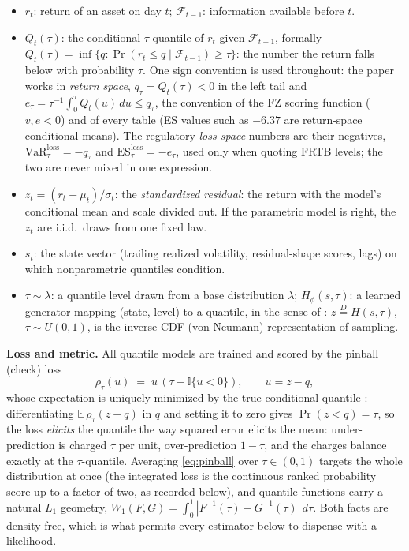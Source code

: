 \documentclass[11pt]{article}
\newcommand{\VaR}{\mathrm{VaR}}
\newcommand{\ES}{\mathrm{ES}}
\theoremstyle{remark}
\begin{document}
\begin{itemize}[leftmargin=1.5em,itemsep=0pt]
\item $r_t$: return of an asset on day $t$; $\mathcal{F}_{t-1}$: information available before $t$.
\item $Q_t(\tau)$: the conditional $\tau$-quantile of $r_t$ given
$\mathcal{F}_{t-1}$, formally
$Q_t(\tau) = \inf\{q : \Pr(r_t \le q \mid \mathcal{F}_{t-1}) \ge \tau\}$:
the number the return falls below with probability $\tau$. One sign
convention is used throughout: the paper works in \emph{return space},
$q_\tau = Q_t(\tau) < 0$ in the left tail and
$e_\tau = \tau^{-1}\int_0^{\tau} Q_t(u)\,du \le q_\tau$, the
convention of the FZ scoring function ($v,e<0$) and of every table
(ES values such as $-6.37$ are return-space conditional means). The
regulatory \emph{loss-space} numbers are their negatives,
$\VaR^{\mathrm{loss}}_\tau=-q_\tau$ and
$\ES^{\mathrm{loss}}_\tau=-e_\tau$, used only when quoting FRTB
levels; the two are never mixed in one expression.
\item $z_t = (r_t-\mu_t)/\sigma_t$: the \emph{standardized residual}:
the return with the model's conditional mean and scale divided out. If
the parametric model is right, the $z_t$ are i.i.d.\ draws from one
fixed law.
\item $s_t$: the state vector (trailing realized volatility,
residual-shape scores, lags) on which nonparametric quantiles condition.
\item $\tau \sim \lambda$: a quantile level drawn from a base
distribution $\lambda$; $H_\phi(s,\tau)$: a learned generator mapping
(state, level) to a quantile, in the sense of
\citet{polson2023gbc}: $z \overset{D}{=} H(s,\tau)$, $\tau\sim U(0,1)$,
is the inverse-CDF (von Neumann) representation of sampling.
\end{itemize}

\noindent\textbf{Loss and metric.} All quantile models are trained and
scored by the pinball (check) loss
\begin{equation}
\rho_\tau(u) \;=\; u\,(\tau - \mathbb{I}\{u<0\}),
\qquad u = z - q,
\label{eq:pinball}
\end{equation}
whose expectation is uniquely minimized by the true conditional quantile
\citep{koenker1978}: differentiating
$\mathbb{E}\,\rho_\tau(z - q)$ in $q$ and setting it to zero gives
$\Pr(z < q) = \tau$, so the loss \emph{elicits} the quantile the way
squared error elicits the mean: under-prediction is charged $\tau$
per unit, over-prediction $1-\tau$, and the charges balance exactly at
the $\tau$-quantile. Averaging \eqref{eq:pinball} over $\tau\in(0,1)$
targets the whole distribution at once (the integrated loss is the
continuous ranked probability score up to a factor of two, as recorded
below), and quantile functions carry a natural $L_1$ geometry,
$W_1(F,G)=\int_0^1 |F^{-1}(\tau)-G^{-1}(\tau)|\,d\tau$. Both facts
are density-free, which is what permits every estimator below to
dispense with a likelihood.
\end{document}

